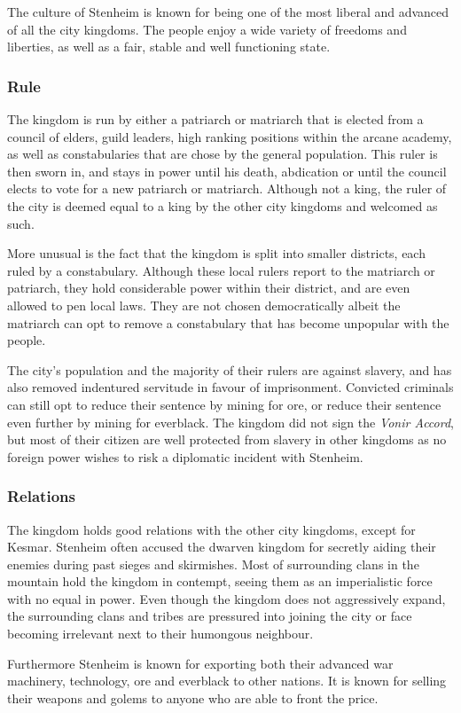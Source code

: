 The culture of Stenheim is known for being one of the most liberal and
advanced of all the city kingdoms. The people enjoy a wide variety of freedoms
and liberties, as well as a fair, stable and well functioning state.

\subsubsection*{Rule}

The kingdom is run by either a patriarch or matriarch that is elected from a
council of elders, guild leaders, high ranking positions within the arcane
academy, as well as constabularies that are chose by the general
population. This ruler is then sworn in, and stays in power until his death,
abdication or until the council elects to vote for a new patriarch or
matriarch. Although not a king, the ruler of the city is deemed equal to a
king by the other city kingdoms and welcomed as such.

More unusual is the fact that the kingdom is split into smaller districts,
each ruled by a constabulary. Although these local rulers report to the
matriarch or patriarch, they hold considerable power within their district,
and are even allowed to pen local laws. They are not chosen democratically
albeit the matriarch can opt to remove a constabulary that has become
unpopular with the people.

The city's population and the majority of their rulers are against slavery,
and has also removed indentured servitude in favour of imprisonment. Convicted
criminals can still opt to reduce their sentence by mining for ore, or reduce their
sentence even further by mining for everblack. The kingdom did not sign the
\emph{Vonir Accord}, but most of their citizen are well protected from slavery
in other kingdoms as no foreign power wishes to risk a diplomatic incident with
Stenheim.

\subsubsection*{Relations}

The kingdom holds good relations with the other city kingdoms, except for
Kesmar. Stenheim often accused the dwarven kingdom for secretly aiding their
enemies during past sieges and skirmishes. Most of surrounding clans in the
mountain hold the kingdom in contempt, seeing them as an imperialistic force
with no equal in power. Even though the kingdom does not aggressively expand,
the surrounding clans and tribes are pressured into joining the city or face
becoming irrelevant next to their humongous neighbour.

Furthermore Stenheim is known for exporting both their advanced war machinery,
technology, ore and everblack to other nations. It is known for selling their
weapons and golems to anyone who are able to front the price.
